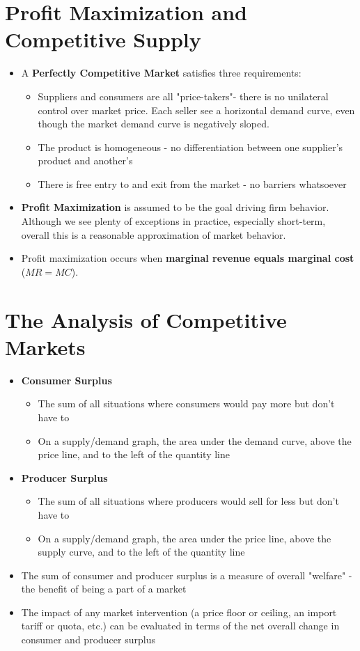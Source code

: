 \documentclass{exam}
\begin{document}
\section{Profit Maximization and Competitive Supply}

\begin{itemize}
  \item A \textbf{Perfectly Competitive Market} satisfies three requirements:
    \begin{itemize}
      \item Suppliers and consumers are all "price-takers"- there is no unilateral control over market price.  Each seller see a horizontal
        demand curve, even though the market demand curve is negatively sloped.
      \item The product is homogeneous - no differentiation between one supplier's product and another's
      \item There is free entry to and exit from the market - no barriers whatsoever
    \end{itemize}
  \item \textbf{Profit Maximization} is assumed to be the goal driving firm behavior.  Although we see plenty of exceptions in practice, especially
    short-term, overall this is a reasonable approximation of market behavior.
  \item Profit maximization occurs when \textbf{marginal revenue equals marginal cost} ($MR = MC$).

\end{itemize}

\section{The Analysis of Competitive Markets}

\begin{itemize}
  \item \textbf{Consumer Surplus}
    \begin{itemize}
      \item The sum of all situations where consumers would pay more but don't have to
      \item On a supply/demand graph, the area under the demand curve, above the price line, and to the left of the quantity line
    \end{itemize}
  \item \textbf{Producer Surplus}
    \begin{itemize}
      \item The sum of all situations where producers would sell for less but don't have to
      \item On a supply/demand graph, the area under the price line, above the supply curve, and to the left of the quantity line
    \end{itemize}
  \item The sum of consumer and producer surplus is a measure of overall "welfare" - the benefit of being a part of a market
  \item The impact of any market intervention (a price floor or ceiling, an import tariff or quota, etc.) can be evaluated in terms of the net
    overall change in consumer and producer surplus
\end{itemize}
\end{document}
